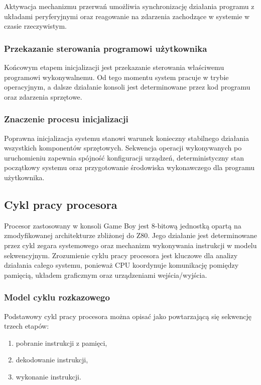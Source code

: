 \documentclass{article}
\begin{document}
Aktywacja mechanizmu przerwań umożliwia synchronizację działania programu z układami peryferyjnymi oraz reagowanie na zdarzenia zachodzące w systemie w czasie rzeczywistym.

\subsubsection{Przekazanie sterowania programowi użytkownika}

Końcowym etapem inicjalizacji jest przekazanie sterowania właściwemu programowi wykonywalnemu. Od tego momentu system pracuje w trybie operacyjnym, a dalsze działanie konsoli jest determinowane przez kod programu oraz zdarzenia sprzętowe.

\subsubsection{Znaczenie procesu inicjalizacji}

Poprawna inicjalizacja systemu stanowi warunek konieczny stabilnego działania wszystkich komponentów sprzętowych. Sekwencja operacji wykonywanych po uruchomieniu zapewnia spójność konfiguracji urządzeń, deterministyczny stan początkowy systemu oraz przygotowanie środowiska wykonawczego dla programu użytkownika.
\subsection{Cykl pracy procesora}

Procesor zastosowany w konsoli Game Boy jest 8-bitową jednostką opartą na zmodyfikowanej architekturze zbliżonej do Z80. Jego działanie jest determinowane przez cykl zegara systemowego oraz mechanizm wykonywania instrukcji w modelu sekwencyjnym. Zrozumienie cyklu pracy procesora jest kluczowe dla analizy działania całego systemu, ponieważ CPU koordynuje komunikację pomiędzy pamięcią, układem graficznym oraz urządzeniami wejścia/wyjścia.

\subsubsection{Model cyklu rozkazowego}

Podstawowy cykl pracy procesora można opisać jako powtarzającą się sekwencję trzech etapów:
\begin{enumerate}
	\item pobranie instrukcji z pamięci,
	\item dekodowanie instrukcji,
	\item wykonanie instrukcji.
\end{enumerate}
\end{document}
